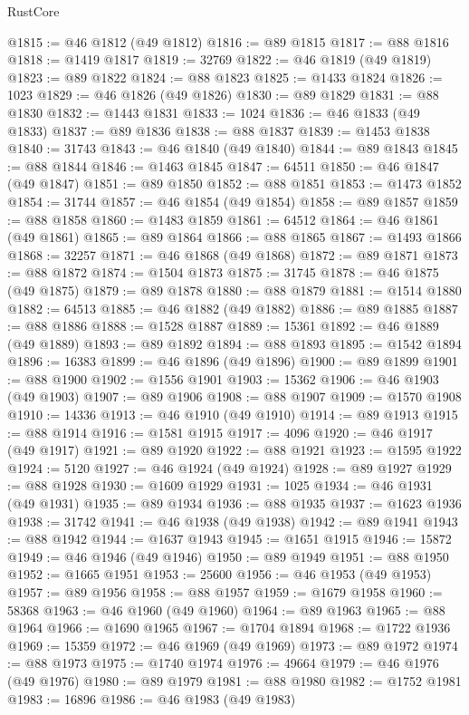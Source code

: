 \begin{lexlean}{RustCore}
\begin{coremodule}
@1815 := @46 @1812 (@49 @1812)
@1816 := @89 @1815
@1817 := @88 @1816
@1818 := @1419 @1817
@1819 := 32769
@1822 := @46 @1819 (@49 @1819)
@1823 := @89 @1822
@1824 := @88 @1823
@1825 := @1433 @1824
@1826 := 1023
@1829 := @46 @1826 (@49 @1826)
@1830 := @89 @1829
@1831 := @88 @1830
@1832 := @1443 @1831
@1833 := 1024
@1836 := @46 @1833 (@49 @1833)
@1837 := @89 @1836
@1838 := @88 @1837
@1839 := @1453 @1838
@1840 := 31743
@1843 := @46 @1840 (@49 @1840)
@1844 := @89 @1843
@1845 := @88 @1844
@1846 := @1463 @1845
@1847 := 64511
@1850 := @46 @1847 (@49 @1847)
@1851 := @89 @1850
@1852 := @88 @1851
@1853 := @1473 @1852
@1854 := 31744
@1857 := @46 @1854 (@49 @1854)
@1858 := @89 @1857
@1859 := @88 @1858
@1860 := @1483 @1859
@1861 := 64512
@1864 := @46 @1861 (@49 @1861)
@1865 := @89 @1864
@1866 := @88 @1865
@1867 := @1493 @1866
@1868 := 32257
@1871 := @46 @1868 (@49 @1868)
@1872 := @89 @1871
@1873 := @88 @1872
@1874 := @1504 @1873
@1875 := 31745
@1878 := @46 @1875 (@49 @1875)
@1879 := @89 @1878
@1880 := @88 @1879
@1881 := @1514 @1880
@1882 := 64513
@1885 := @46 @1882 (@49 @1882)
@1886 := @89 @1885
@1887 := @88 @1886
@1888 := @1528 @1887
@1889 := 15361
@1892 := @46 @1889 (@49 @1889)
@1893 := @89 @1892
@1894 := @88 @1893
@1895 := @1542 @1894
@1896 := 16383
@1899 := @46 @1896 (@49 @1896)
@1900 := @89 @1899
@1901 := @88 @1900
@1902 := @1556 @1901
@1903 := 15362
@1906 := @46 @1903 (@49 @1903)
@1907 := @89 @1906
@1908 := @88 @1907
@1909 := @1570 @1908
@1910 := 14336
@1913 := @46 @1910 (@49 @1910)
@1914 := @89 @1913
@1915 := @88 @1914
@1916 := @1581 @1915
@1917 := 4096
@1920 := @46 @1917 (@49 @1917)
@1921 := @89 @1920
@1922 := @88 @1921
@1923 := @1595 @1922
@1924 := 5120
@1927 := @46 @1924 (@49 @1924)
@1928 := @89 @1927
@1929 := @88 @1928
@1930 := @1609 @1929
@1931 := 1025
@1934 := @46 @1931 (@49 @1931)
@1935 := @89 @1934
@1936 := @88 @1935
@1937 := @1623 @1936
@1938 := 31742
@1941 := @46 @1938 (@49 @1938)
@1942 := @89 @1941
@1943 := @88 @1942
@1944 := @1637 @1943
@1945 := @1651 @1915
@1946 := 15872
@1949 := @46 @1946 (@49 @1946)
@1950 := @89 @1949
@1951 := @88 @1950
@1952 := @1665 @1951
@1953 := 25600
@1956 := @46 @1953 (@49 @1953)
@1957 := @89 @1956
@1958 := @88 @1957
@1959 := @1679 @1958
@1960 := 58368
@1963 := @46 @1960 (@49 @1960)
@1964 := @89 @1963
@1965 := @88 @1964
@1966 := @1690 @1965
@1967 := @1704 @1894
@1968 := @1722 @1936
@1969 := 15359
@1972 := @46 @1969 (@49 @1969)
@1973 := @89 @1972
@1974 := @88 @1973
@1975 := @1740 @1974
@1976 := 49664
@1979 := @46 @1976 (@49 @1976)
@1980 := @89 @1979
@1981 := @88 @1980
@1982 := @1752 @1981
@1983 := 16896
@1986 := @46 @1983 (@49 @1983)

\end{coremodule}
\end{lexlean}
